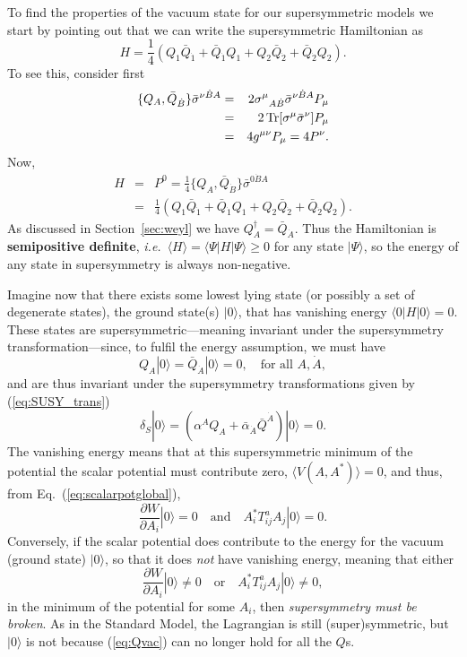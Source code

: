 \documentclass[notes.tex]{subfiles}
\begin{document}
To find the properties of the vacuum state for our supersymmetric models we start by pointing out that we can write the supersymmetric Hamiltonian as
\[H = \frac{1}{4}(Q_1\bar{Q}_{\dot{1}} + \bar{Q}_{\dot{1}}Q_1 + Q_2\bar{Q}_{\dot{2}} + \bar{Q}_{\dot{2}}Q_2).\]
To see this, consider first
\begin{eqnarray*}
\{Q_A, \bar{Q}_{\dot{B}}\}\bar{\sigma}^{\nu\dot{B}A} &=& 2\sigma^\mu{}_{A\dot{B}}\bar{\sigma}^{\nu\dot{B}A}P_\mu\\
 &=& 2\,{\rm Tr}[\sigma^\mu\bar{\sigma}^\nu]P_\mu\\
  &=& 4g^{\mu\nu}P_\mu =4P^\nu.
\end{eqnarray*}
Now,
\begin{eqnarray*}
H &=& P^0 = \frac{1}{4}\{Q_A, \bar{Q}_{\dot{B}}\} \bar{\sigma}^{0\dot{B}A}\\
 &=& \frac{1}{4}(Q_1\bar{Q}_{\dot{1}} + \bar{Q}_{\dot{1}}Q_1 + Q_2\bar{Q}_{\dot{2}} + \bar{Q}_{\dot{2}}Q_2).
\end{eqnarray*}
As discussed in Section~\ref{sec:weyl} we have $Q_A^\dagger=\bar Q_{\dot A}$. Thus the Hamiltonian is {\bf semipositive definite}, {\it i.e.}\ $\langle H\rangle=\langle \Psi|H|\Psi\rangle \geq 0$ for any state $|\Psi\rangle$, so the energy of any state in supersymmetry is always non-negative.

Imagine now that there exists some lowest lying state (or possibly a set of degenerate states), the ground state(s) $|0\rangle$, that has vanishing energy $\langle0|H|0\rangle = 0$. These states are supersymmetric---meaning invariant under the supersymmetry transformation---since, to fulfil the energy assumption, we must have
\begin{equation}
Q_A|0\rangle = \bar{Q}_{\dot{A}}|0\rangle = 0, \quad\text{for all } A,\dot{A},\label{eq:Qvac}
\end{equation}
and are thus invariant under the supersymmetry transformations given by  (\ref{eq:SUSY_trans})
\begin{equation}
\delta_S |0\rangle = (\alpha^AQ_A + \bar{\alpha}_{\dot{A}}\bar{Q}^{\dot{A}})|0\rangle = 0.
\end{equation}
The vanishing energy means that at this supersymmetric minimum of the potential the scalar potential must contribute zero, $\langle V(A, A^*)\rangle=0$, and thus, from Eq.~(\ref{eq:scalarpotglobal}),
\[ \frac{\partial W}{\partial A_i} |0\rangle= 0\quad\text{and} \quad  A_i^*T_{ij}^aA_j|0\rangle=0.\]
Conversely, if the scalar potential does contribute to the energy for the vacuum (ground state) $|0\rangle$, so that it does {\it not} have vanishing energy, meaning that either
\[ \frac{\partial W}{\partial A_i} |0\rangle\neq 0 \quad\text{or}\quad  A_i^*T_{ij}^aA_j|0\rangle\neq 0, \]
in the minimum of the potential for some $A_i$, then {\it supersymmetry must be broken}. As in the Standard Model, the Lagrangian is still (super)symmetric, but $|0\rangle$ is not because (\ref{eq:Qvac}) can no longer hold for all the $Q$s.
\end{document}
